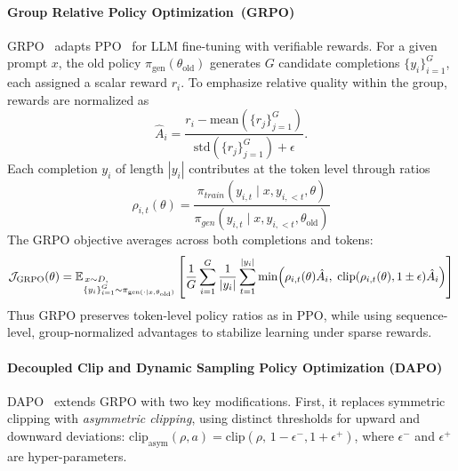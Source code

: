 \documentclass[]{fairmeta} %
\begin{document}
\paragraph{Group Relative Policy Optimization~(GRPO)}
GRPO~\citep{shao2024deepseekmath} adapts PPO~\cite{schulman2017ppo} for LLM fine-tuning with verifiable rewards. 
For a given prompt $x$, the old policy $\pi_{\text{gen}}(\theta_{\text{old}})$ generates $G$ candidate completions $\{y_i\}_{i=1}^G$, each assigned a scalar reward $r_i$. 
To emphasize relative quality within the group, rewards are normalized as
\begin{equation}
    \hat{A}_i = \frac{r_i - \mathrm{mean}(\{r_j\}_{j=1}^G)}{\mathrm{std}(\{r_j\}_{j=1}^G) + \epsilon}. \label{eq:advantage}
\end{equation}
Each completion $y_i$ of length $|y_i|$ contributes at the token level through ratios
\begin{equation}
    \rho_{i,t}(\theta) = \frac{\pi_{train}(y_{i,t} \mid x, y_{i,<t},\theta)}{\pi_{gen}(y_{i,t} \mid x, y_{i,<t}, \theta_{\text{old}})}
\end{equation}
The GRPO objective averages across both completions and tokens:
\begin{equation}
    \mathcal{J}_{\mathrm{GRPO}}(\theta) 
    = \mathbb{E}_{\begin{subarray}{l} \, x \sim D, \\ \{y_i\}_{i=1}^G \sim \pi_{\text{gen}(\cdot \mid x, \theta_{\text{old}})} \end{subarray}}
    \left[ \frac{1}{G} \sum_{i=1}^G \frac{1}{|y_i|} \sum_{t=1}^{|y_i|}
    \min\!\left( \rho_{i,t}(\theta)\hat{A}_i,\; \mathrm{clip}(\rho_{i,t}(\theta), 1\pm \epsilon)\hat{A}_i \right) \right]
\end{equation}
Thus GRPO preserves token-level policy ratios as in PPO, while using sequence-level, group-normalized advantages to stabilize learning under sparse rewards.

\paragraph{Decoupled Clip and Dynamic Sampling Policy Optimization (DAPO)}
DAPO~\citep{yu2025dapo} extends GRPO with two key modifications.  
First, it replaces symmetric clipping with \emph{asymmetric clipping}, using distinct thresholds for upward and downward deviations: $\mathrm{clip}_{\mathrm{asym}}(\rho, a) = \mathrm{clip}(\rho,\, 1-\epsilon^-, 1+\epsilon^+) $, where $\epsilon^-$ and $\epsilon^+$ are hyper-parameters.
\end{document}
